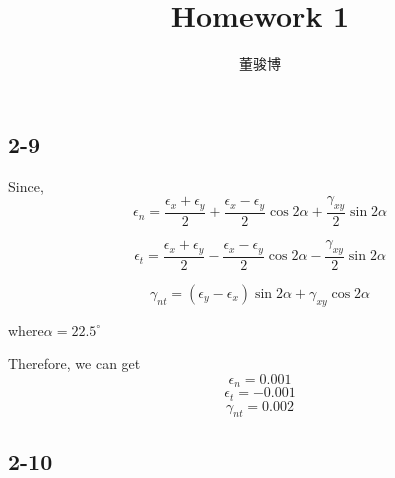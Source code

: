 \documentclass[onecolumn,oneside]{SUSTechHomework}
\author{董骏博}
\title{Homework 1}
\begin{document}
  \maketitle
  \subsection*{2-9}
  Since, 
   \[
   \epsilon_n = \frac{\epsilon_x + \epsilon_y}{2} + \frac{\epsilon_x - \epsilon_y}{2}  \cos2\alpha + \frac{\gamma_{xy}}{2} \sin 2\alpha
   \]
   
   \[
   \epsilon_t = \frac{\epsilon_x + \epsilon_y}{2} - \frac{\epsilon_x - \epsilon_y}{2}  \cos2\alpha - \frac{\gamma_{xy}}{2} \sin 2\alpha
   \]

   \[
   \gamma_{nt} = (\epsilon_y - \epsilon_x) \sin2\alpha + \gamma_{xy}\cos2\alpha
   \]

   where\(\alpha = 22.5^{\circ}\)

   Therefore, we can get 
   \[\epsilon_n = 0.001\]
   \[\epsilon_t = -0.001\]
   \[\gamma_{nt} = 0.002\]

  \subsection*{2-10}
\end{document}
